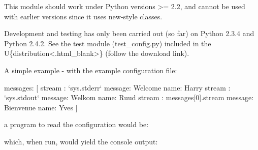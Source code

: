 \documentclass[a4paper,10pt,english]{sphinxmanual}
\begin{document}
This module should work under Python versions \textgreater{}= 2.2, and cannot be used with
earlier versions since it uses new-style classes.

Development and testing has only been carried out (so far) on Python 2.3.4 and
Python 2.4.2. See the test module (test\_config.py) included in the
U\{distribution\textless{}.html\textbar{}\_blank\textgreater{}\} (follow the
download link).

A simple example - with the example configuration file:

%
\begin{sphinxVerbatim}[commandchars=\\\{\}]
messages:
[
  \PYGZob{}
    stream : {}`sys.stderr{}`
    message: \PYGZsq{}Welcome\PYGZsq{}
    name: \PYGZsq{}Harry\PYGZsq{}
  \PYGZcb{}
  \PYGZob{}
    stream : {}`sys.stdout{}`
    message: \PYGZsq{}Welkom\PYGZsq{}
    name: \PYGZsq{}Ruud\PYGZsq{}
  \PYGZcb{}
  \PYGZob{}
    stream : \PYGZdl{}messages[0].stream
    message: \PYGZsq{}Bienvenue\PYGZsq{}
    name: Yves
  \PYGZcb{}
]
\end{sphinxVerbatim}

a program to read the configuration would be:

%
\begin{sphinxVerbatim}[commandchars=\\\{\}]
   

  
  
   
         
           
      
         
\end{sphinxVerbatim}

which, when run, would yield the console output:

%
\begin{sphinxVerbatim}[commandchars=\\\{\}]
 
 
 
\end{sphinxVerbatim}
\end{document}
